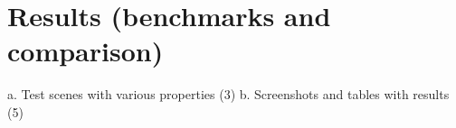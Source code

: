 
\chapter{Results (benchmarks and comparison)}

a.	Test scenes with various properties (3)
b.	Screenshots and tables with results (5)
